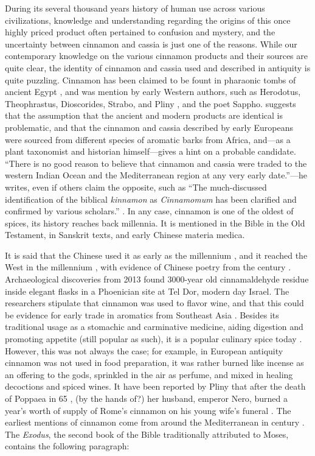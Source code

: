 During its several thousand years history of human use across various civilizations, knowledge and understanding regarding the origins of this once highly priced product often pertained to confusion and mystery, and the uncertainty between cinnamon and cassia is just one of the reasons. While our contemporary knowledge on the various cinnamon products and their sources are quite clear, the identity of cinnamon and cassia used and described in antiquity is quite puzzling. Cinnamon has been claimed to be fount in pharaonic tombs of ancient Egypt \parencite[see Meyerhof and Sobhy in][471,475]{al-ghafiki_abridged_1932}, and was mention by early Western authors, such as Herodotus, Theophrastus, Dioscorides, Strabo, and Pliny \parencite[541]{laufer_sino-iranica_1919}, and the poet Sappho. \textcite{haw_cinnamon_2017} suggests that the assumption that the ancient and modern products are identical is problematic, and that the cinnamon and cassia described by early Europeans were sourced from different species of aromatic barks from Africa, and---as a plant taxonomist and historian himself---gives a hint on a probable candidate. ``There is no good reason to believe that cinnamon and cassia were traded to the western Indian Ocean and the Mediterranean region at any very early date.''---he writes, even if others claim the opposite, such as ``The much-discussed identification of the biblical \textit{kinnamon} as \textit{Cinnamomum} has been clarified and confirmed by various scholars.'' \parencite[202]{zohary_plants_1982}. In any case, cinnamon is one of the oldest of spices, its history reaches back millennia. It is mentioned in the Bible in the Old Testament, in Sanskrit texts, and early Chinese \gls{materia medica}.

It is said that the Chinese used it as early as the  millennium \BC{}, and it reached the West in the  millennium \BC{} \parencites{dietrich_dar_2004}, with evidence of Chinese poetry from the  century \BC{} \autocite[38]{dalby_dangerous_2000}. Archaeological discoveries from 2013 found 3000-year old cinnamaldehyde residue inside elegant flasks in a Phoenician site at Tel Dor, modern day Israel. The researchers stipulate that cinnamon was used to flavor wine, and that this could be evidence for early trade in aromatics from Southeast Asia \parencite{namdar_cinnamaldehyde_2013}. Besides its traditional usage as a stomachic and carminative medicine, aiding digestion and promoting appetite (still popular as such), it is a popular culinary spice today \parencite{ulbricht_evidence-based_2011}. However, this was not always the case; for example, in European antiquity cinnamon was not used in food preparation, it was rather burned like incense as an offering to the gods, sprinkled in the air as perfume, and mixed in healing decoctions and spiced wines. It have been reported by Pliny that after the death of Poppaea in 65 \AD{}, (by the hands of?) her husband, emperor Nero, burned a year's worth of supply of Rome's cinnamon on his young wife's funeral \autocite{counts_regum_1996}. The earliest mentions of cinnamon come from around the Mediterranean in  century \BC{}. The \textit{Exodus}, the second book of the Bible traditionally attributed to Moses, contains the following paragraph: 

